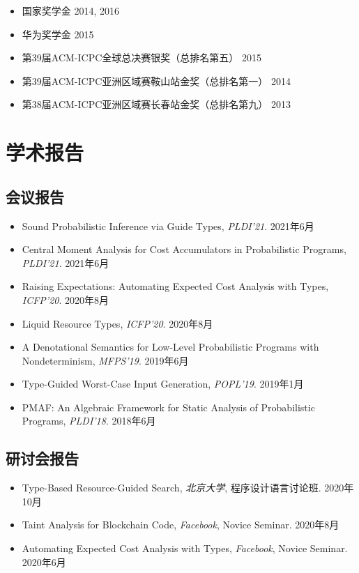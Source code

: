 \documentclass[11pt,letterpaper,roman]{moderncv}        %
\begin{document}
\begin{itemize}
\item 国家奖学金 \hfill 2014, 2016
\item 华为奖学金 \hfill 2015

  \vspace{4pt}

  \item 第39届ACM-ICPC全球总决赛银奖（总排名第五） \hfill 2015
  \item 第39届ACM-ICPC亚洲区域赛鞍山站金奖（总排名第一） \hfill 2014
  \item 第38届ACM-ICPC亚洲区域赛长春站金奖（总排名第九） \hfill 2013
\end{itemize}

\section{学术报告}

\subsection{会议报告}

\begin{itemize}
  \item {Sound Probabilistic Inference via Guide Types}, \emph{PLDI'21}. \hfill 2021年6月
  \item {Central Moment Analysis for Cost Accumulators in Probabilistic Programs}, \emph{PLDI'21}. \hfill 2021年6月
  \item {Raising Expectations: Automating Expected Cost Analysis with Types}, \emph{ICFP'20}. \hfill 2020年8月
  \item {Liquid Resource Types}, \emph{ICFP'20}. \hfill 2020年8月
  \item {A Denotational Semantics for Low-Level Probabilistic Programs with Nondeterminism}, \emph{MFPS'19}. \hfill 2019年6月
  \item {Type-Guided Worst-Case Input Generation}, \emph{POPL'19}. \hfill 2019年1月
  \item {PMAF: An Algebraic Framework for Static Analysis of Probabilistic Programs}, \emph{PLDI'18}. \hfill 2018年6月
\end{itemize}

\subsection{研讨会报告}

\begin{itemize}
  \item {Type-Based Resource-Guided Search}, \emph{北京大学}, 程序设计语言讨论班. \hfill 2020年10月
  \item {Taint Analysis for Blockchain Code}, \emph{Facebook}, Novice Seminar. \hfill 2020年8月
  \item {Automating Expected Cost Analysis with Types}, \emph{Facebook}, Novice Seminar. \hfill 2020年6月
\end{itemize}
\end{document}
